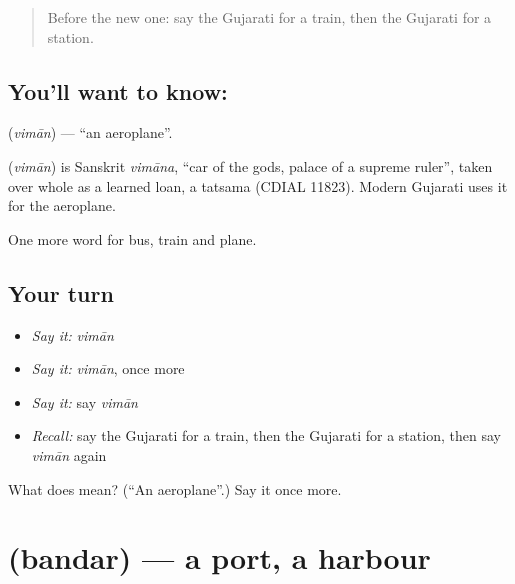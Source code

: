 \label{lesson:GU-C85-plane}



\begin{quote}
Before the new one: say the Gujarati for a train, then the Gujarati for a station.
\end{quote}

\subsection*{You'll want to know: }
\textbf{} (\emph{vimān}) — \textquotedblleft{}an aeroplane\textquotedblright{}.

\begin{cousinweb}
\textbf{} (\emph{vimān}) is Sanskrit \emph{vimāna}, \textquotedblleft{}car of the gods, palace of a supreme ruler\textquotedblright{}, taken over whole as a learned loan, a tatsama (CDIAL 11823). Modern Gujarati uses it for the aeroplane.
\end{cousinweb}

\begin{grammarlens}[title={What you've built}]
One more word for bus, train and plane.
\end{grammarlens}

\subsection*{Your turn}
\begin{itemize}
\raggedright
  \item \emph{Say it:} \emph{vimān}
  \item \emph{Say it:} \emph{vimān}, once more
  \item \emph{Say it:} say \emph{vimān}
  \item \emph{Recall:} say the Gujarati for a train, then the Gujarati for a station, then say \emph{vimān} again
\end{itemize}

\begin{tcolorbox}[breakable,colback=teal!4,colframe=teal!35!black,title={Before you move on}]
What does  mean? (\textquotedblleft{}An aeroplane\textquotedblright{}.) Say it once more.
\end{tcolorbox}
\section[\texorpdfstring{\gu{બંદર} (bandar)}{બંદર (bandar)}]{ (bandar) — a port, a harbour}

